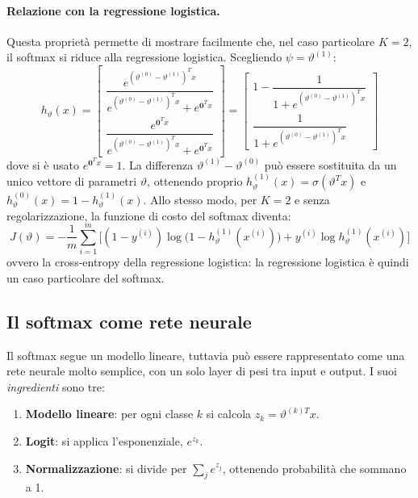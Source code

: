 \paragraph{Relazione con la regressione logistica.}
Questa proprietà permette di mostrare facilmente che, nel caso particolare $K = 2$, il softmax si riduce alla regressione logistica. Scegliendo $\psi = \vartheta^{(1)}$:
\[
h_\vartheta(x) =
\begin{bmatrix}
\dfrac{e^{(\vartheta^{(0)} - \vartheta^{(1)})^T x}}{e^{(\vartheta^{(0)} - \vartheta^{(1)})^T x} + e^{\mathbf{0}^T x}} \\[12pt]
\dfrac{e^{\mathbf{0}^T x}}{e^{(\vartheta^{(0)} - \vartheta^{(1)})^T x} + e^{\mathbf{0}^T x}}
\end{bmatrix}
=
\begin{bmatrix}
1 - \dfrac{1}{1 + e^{(\vartheta^{(0)} - \vartheta^{(1)})^T x}} \\[12pt]
\dfrac{1}{1 + e^{(\vartheta^{(0)} - \vartheta^{(1)})^T x}}
\end{bmatrix}
\]
dove si è usato $e^{\mathbf{0}^T x} = 1$. La differenza $\vartheta^{(1)} - \vartheta^{(0)}$ può essere sostituita da un unico vettore di parametri $\vartheta$, ottenendo proprio $h_\vartheta^{(1)}(x) = \sigma(\vartheta^T x)$ e $h_\vartheta^{(0)}(x) = 1 - h_\vartheta^{(1)}(x)$. Allo stesso modo, per $K = 2$ e senza regolarizzazione, la funzione di costo del softmax diventa:
\[
J(\vartheta) = -\frac{1}{m}\sum_{i=1}^{m}\Big[(1 - y^{(i)})\log\big(1 - h_\vartheta^{(1)}(x^{(i)})\big) + y^{(i)}\log h_\vartheta^{(1)}(x^{(i)})\Big]
\]
ovvero la cross-entropy della regressione logistica: la regressione logistica è quindi un caso particolare del softmax.

\subsection{Il softmax come rete neurale}
Il softmax segue un modello lineare, tuttavia può essere rappresentato come una rete neurale molto semplice, con un solo layer di pesi tra input e output. I suoi \emph{ingredienti} sono tre:
\begin{enumerate}
    \item \textbf{Modello lineare}: per ogni classe $k$ si calcola $z_k = \vartheta^{(k)T}x$.
    \item \textbf{Logit}: si applica l'esponenziale, $e^{z_k}$.
    \item \textbf{Normalizzazione}: si divide per $\sum_j e^{z_j}$, ottenendo probabilità che sommano a 1.
\end{enumerate}

